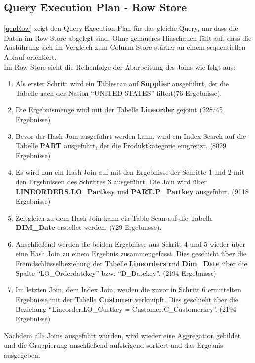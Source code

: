 \subsection{Query Execution Plan - Row Store}
\autoref{qepRow} zeigt den Query Execution Plan für das gleiche Query, nur dass die Daten im Row Store abgelegt sind. Ohne genaueres Hinschauen fällt auf, dass die Ausführung sich im Vergleich zum Column Store stärker an einem sequentiellen Ablauf orientiert.\\ Im Row Store sieht die Reihenfolge der Abarbeitung des Joins wie folgt aus:
\begin{enumerate}
	\item Als erster Schritt wird ein Tablescan auf \textbf{Supplier} ausgeführt, der die Tabelle nach der Nation \enquote{UNITED STATES} filtert(76 Ergebnisse).
	\item Die Ergebnismenge wird mit der Tabelle \textbf{Lineorder} gejoint (228745 Ergebnisse)
	\item Bevor der Hash Join ausgeführt werden kann, wird ein Index Search auf die Tabelle \textbf{PART} ausgeführt, der die Produktkategorie eingrenzt. (8029 Ergebnisse)
	\item Es wird nun ein Hash Join auf mit den Ergebnisse der Schritte 1 und 2 mit den Ergebnissen des Schrittes 3 ausgeführt. Die Join wird über \textbf{LINEORDERS.LO\_Partkey} und \textbf{PART.P\_Partkey} ausgeführt. (9118 Ergebnisse)
	\item Zeitgleich zu dem Hash Join kann ein Table Scan auf die Tabelle \textbf{DIM\_Date} erstellet werden. (729 Ergebnisse).
	\item Anschließend werden die beiden Ergebnisse aus Schritt 4 und 5 wieder über eine Hash Join zu einem Ergebnis zusammengefasst. Dies geschieht über die Fremdschlüsselbeziehung der Tabelle \textbf{Lineorders} und \textbf{Dim\_Date} über die Spalte \enquote{LO\_Orderdatekey} bzw. \enquote{D\_Datekey}. (2194 Ergebnisse)
	\item Im letzten Join, dem Index Join, werden die zuvor in Schritt 6 ermittelten Ergebnisse mit der Tabelle \textbf{Customer} verknüpft. Dies geschieht über die Beziehung \enquote{Lineorder.LO\_Custkey = Customer.C\_Customerkey}. (2194 Ergebnisse)
\end{enumerate}
Nachdem alle Joins ausgeführt wurden, wird wieder eine Aggregation gebildet und die Gruppierung anschließend aufsteigend sortiert und das Ergebnis ausgegeben.
